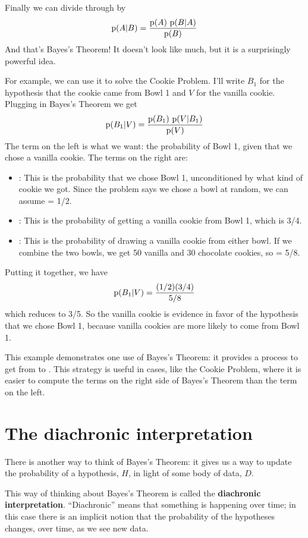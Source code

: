\documentclass[12pt]{book}
\begin{document}
Finally we can divide through by 
%
\[ \mathrm{p}(A|B) = \frac{\mathrm{p}(A)~\mathrm{p}(B|A)}{\mathrm{p}(B)} \]
%
And that's Bayes's Theorem!  It doesn't look like much, but
it is a surprisingly powerful idea.

For example, we can use it to solve the Cookie Problem.  I'll write
$B_1$ for the hypothesis that the cookie came from Bowl 1
and $V$ for the vanilla cookie.  Plugging in Bayes's Theorem
we get
%
\[ \mathrm{p}(B_1|V) = \frac{\mathrm{p}(B_1)~\mathrm{p}(V|B_1)}{\mathrm{p}(V)} \]
%
The term on the left is what we want: the probability of Bowl 1, given
that we chose a vanilla cookie.  The terms on the right are:

\begin{itemize}

\item {}: This is the probability that we chose Bowl 1, unconditioned
by what kind of cookie we got.  Since the problem says we chose a
bowl at random, we can assume  = 1/2.

\item {}: This is the probability of getting a vanilla cookie
from Bowl 1, which is 3/4.

\item {}: This is the probability of drawing a vanilla cookie from
either bowl.  If we combine the two bowls, we get 50 vanilla and 30
chocolate cookies, so  = 5/8.

\end{itemize}

Putting it together, we have 
%
\[ \mathrm{p}(B_1|V) = \frac{(1/2)(3/4)}{5/8} \]
%
which reduces to 3/5.  So the vanilla cookie is evidence in favor of
the hypothesis that we chose Bowl 1, because vanilla cookies are more
likely to come from Bowl 1.

This example demonstrates one use of Bayes's Theorem: it provides
a process to get from  to .  This strategy is useful
in cases, like the Cookie Problem, where it is easier to compute
the terms on the right side of Bayes's Theorem than the term on the
left.


\section{The diachronic interpretation}

There is another way to think of Bayes's Theorem: it gives us a
way to update the probability of a hypothesis, $H$, in light of
some body of data, $D$.

This way of thinking about Bayes's Theorem is called the
{\bf diachronic interpretation}.  ``Diachronic'' means that something
is happening over time; in this case there is an implicit notion
that the probability of the hypotheses changes, over time, as
we see new data.
\end{document}
